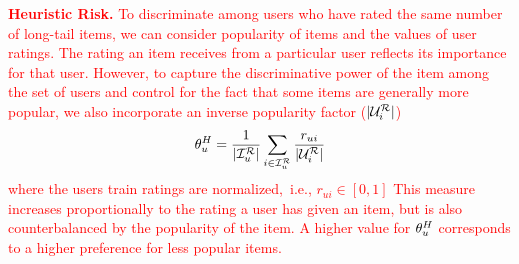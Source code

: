 \textcolor{red}{ \textbf{Heuristic Risk. }To discriminate among users who have rated the same number of long-tail items,  we can consider popularity of items and the values of user ratings. The rating an item receives from a particular user reflects its importance for that user. However, to capture the discriminative power of the item among the set of users and control for the fact that some items are generally more popular, we also incorporate an inverse popularity factor ($|\mathcal{U}_{i}^{\mathcal{R}}|$)   %
\begin{equation}
\small
\theta_u^{H} = \frac{ 1}{\vert \mathcal{I}_{u}^{\mathcal{R}} \vert} \sum_{i \in \mathcal{I}_{u}^{\mathcal{R}}} \frac{r_{ui}}{|\mathcal{U}_{i}^{\mathcal{R}}|} 
\label{eq:heuristic-risk}
\end{equation}
where the users train ratings are normalized,~i.e., $r_{ui} \in [0,1]$ This measure increases proportionally to the rating a user has given an item, but is also counterbalanced by the popularity of the item. A higher value for $\theta_u^{H}$ corresponds to a higher preference for less popular items.
}
\fi

%

